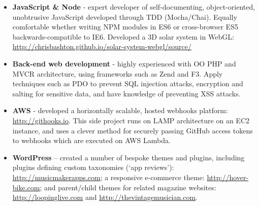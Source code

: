 \documentclass[class=article, crop=false]{standalone}
\begin{document}
\begin{itemize}
    \item \textbf{JavaScript \& Node} - expert developer of self-documenting, object-oriented, unobtrusive JavaScript developed through TDD (Mocha/Chai). Equally comfortable whether writing NPM modules in ES6 or cross-browser ES5 backwards-compatible to IE6. Developed a 3D solar system in WebGL: \url{http://chrisbashton.github.io/solar-system-webgl/source/}

    \item \textbf{Back-end web development} - highly experienced with OO PHP and MVCR architecture, using frameworks such as Zend and F3. Apply techniques such as PDO to prevent SQL injection attacks, encryption and salting for sensitive data, and have knowledge of preventing XSS attacks.

    \item \textbf{AWS} - developed a horizontally scalable, hosted webhooks platform: \url{http://githooks.io}. This side project runs on LAMP architecture on an EC2 instance, and uses a clever method for securely passing GitHub access tokens to webhooks which are executed on AWS Lambda.

    \item \textbf{WordPress} – created a number of bespoke themes and plugins, including plugins defining custom taxonomies (`app reviews'): \url{http://musicmakerapps.com}; a responsive e-commerce theme: \url{http://hover-bike.com}; and parent/child themes for related magazine websites: \linebreak\url{http://loopinglive.com} and \url{http://thevintagemusician.com}.

\end{itemize}
\end{document}
